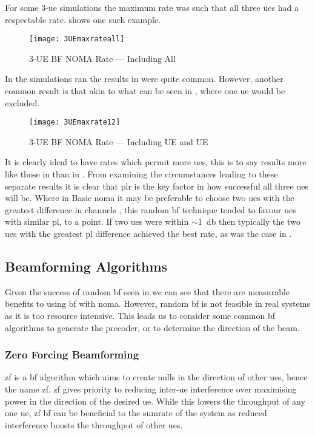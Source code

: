 \par
For some 3-\ac{ue} simulations the maximum rate was such that all three \acp{ue} had a respectable rate.
 shows one such example.

\begin{figure}[htb]
	\centering
	\texttt{[image: 3UEmaxrateall]}
	\caption{3-UE BF NOMA Rate --- Including All}
	\label{fig:bf3ueRate}
\end{figure}

\par
In the simulations ran the results in  were quite common.
However, another common result is that akin to what can be seen in , where one \ac{ue} would be excluded.

\begin{figure}[htb]
	\centering
	\texttt{[image: 3UEmaxrate12]}
	\caption{3-UE BF NOMA Rate --- Including UE and UE}
	\label{fig:bf3ueRate2}
\end{figure}

\par
It is clearly ideal to have rates which permit more \acp{ue}, this is to say results more like those in  than in .
From examining the circumstances leading to these separate results it is clear that \ac{plr} is the key factor in how successful all three \acp{ue} will be.
Where in Basic \ac{noma} it may be preferable to choose two \acp{ue} with the greatest difference in channels  \cite{ding:2016}, this random \ac{bf} technique tended to favour \acp{ue} with similar \ac{pl}, to a point.
If two \acp{ue} were within $\sim$\SI{1}{\decibel} then typically the two \acp{ue} with the greatest \ac{pl} difference achieved the best rate, as was the case in .

\subsection{Beamforming Algorithms}
Given the success of random \ac{bf} seen in  we can see that there are measurable benefits to using \ac{bf} with \ac{noma}.
However, random \ac{bf} is not feasible in real systems as it is too resource intensive.
This leads us to consider some common \ac{bf} algorithms to generate the precoder, or to determine the direction of the beam.

\subsubsection{Zero Forcing Beamforming}
\ac{zf} is a \ac{bf} algorithm which aims to create nulls in the direction of other \acp{ue}, hence the name \acl{zf}.
\ac{zf} gives priority to reducing inter-\ac{ue} interference over maximising power in the direction of the desired \ac{ue}.
While this lowers the throughput of any one \ac{ue}, \ac{zf} \ac{bf} can be beneficial to the sumrate of the system as reduced interference boosts the throughput of other \acp{ue}.

